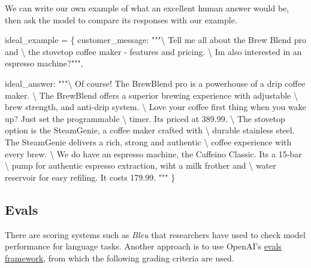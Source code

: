 \documentclass[
  letterpaper,
  DIV=11,
  numbers=noendperiod]{scrreprt}
\newenvironment{Shaded}{\begin{snugshade}}{\end{snugshade}}
\newcommand{\CharTok}[1]{\textcolor[rgb]{0.13,0.47,0.30}{#1}}
\newcommand{\NormalTok}[1]{\textcolor[rgb]{0.00,0.23,0.31}{#1}}
\newcommand{\OperatorTok}[1]{\textcolor[rgb]{0.37,0.37,0.37}{#1}}
\newcommand{\StringTok}[1]{\textcolor[rgb]{0.13,0.47,0.30}{#1}}
\begin{document}
We can write our own example of what an excellent human answer would be,
then ask the model to compare its responses with our example.

\begin{Shaded}
\begin{Highlighting}[]
\NormalTok{ideal\_example }\OperatorTok{=}\NormalTok{ \{}
    \StringTok{\textquotesingle{}customer\_message\textquotesingle{}}\NormalTok{: }\StringTok{"""}\CharTok{\textbackslash{}}
\StringTok{    Tell me all about the Brew Blend pro and }\CharTok{\textbackslash{}}
\StringTok{    the stovetop coffee maker {-} features and pricing. }\CharTok{\textbackslash{}}
\StringTok{    I\textquotesingle{}m also interested in an espresso machine?"""}\NormalTok{,}

    \StringTok{\textquotesingle{}ideal\_answer\textquotesingle{}}\NormalTok{: }\StringTok{"""}\CharTok{\textbackslash{}}
\StringTok{    Of course! The BrewBlend pro is a powerhouse of a drip coffee maker. }\CharTok{\textbackslash{}}
\StringTok{    The BrewBlend offers a superior brewing experience with adjustable }\CharTok{\textbackslash{}}
\StringTok{    brew strength, and anti{-}drip system. }\CharTok{\textbackslash{}}
\StringTok{    Love your coffee first thing when you wake up? Just set the programmable }\CharTok{\textbackslash{}}
\StringTok{    timer. It\textquotesingle{}s priced at 389.99. }\CharTok{\textbackslash{}}
\StringTok{    The stovetop option is the SteamGenie, a coffee maker crafted with }\CharTok{\textbackslash{}}
\StringTok{    durable stainless steel. The SteamGenie delivers a rich, strong and authentic }\CharTok{\textbackslash{}}
\StringTok{    coffee experience with every brew. }\CharTok{\textbackslash{}}
\StringTok{    We do have an espresso machine, the Caffeino Classic. It\textquotesingle{}s a 15{-}bar }\CharTok{\textbackslash{}}
\StringTok{    pump for authentic espresso extraction, wiht a milk frother and }\CharTok{\textbackslash{}}
\StringTok{    water reservoir for easy refiling. It costs 179.99.}
\StringTok{    """}
\NormalTok{\}}
\end{Highlighting}
\end{Shaded}

\hypertarget{evals}{%
\subsection{Evals}\label{evals}}

There are scoring systems such as \emph{Bleu} that researchers have used
to check model performance for language tasks. Another approach is to
use OpenAI's \href{https://github.com/openai/evals}{evals framework},
from which the following grading criteria are used.
\end{document}
